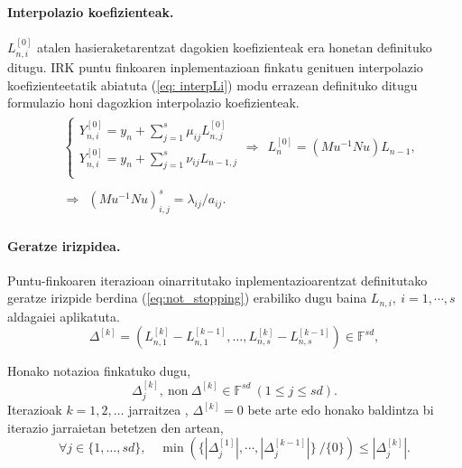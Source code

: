 \paragraph*{Interpolazio koefizienteak.} $L_{n,i}^{[0]}$ atalen hasieraketarentzat dagokien koefizienteak era honetan definituko ditugu. IRK puntu finkoaren inplementazioan finkatu genituen interpolazio koefizienteetatik abiatuta (\ref{eq: interpLi}) modu errazean definituko ditugu formulazio honi dagozkion interpolazio koefizienteak.
\begin{align}
\begin{split}
&\left \{ \begin{array}{c}
  Y_{n,i}^{[0]}=y_n+\sum_{j=1}^{s} \mu_{ij} L_{n,j}^{[0]} \\[.25cm]
  Y_{n,i}^{[0]}=y_n+\sum_{j=1}^{s} \nu_{ij} L_{n-1,j} \\
          \end{array} \right. 
\Rightarrow \ \ L_n^{{[0]}}=(Mu^{-1} Nu) L_{n-1},\\
\\
&\Rightarrow  \ \ (Mu^{-1} Nu)_{i,j}^{s}=\lambda_{ij}/a_{ij}.
\end{split}
\end{align}

\paragraph*{Geratze irizpidea.} Puntu-finkoaren iterazioan oinarritutako inplementazioarentzat definitutako geratze irizpide berdina (\ref{eq:not_stopping}) erabiliko dugu baina $L_{n,i}, \ i=1,\cdots,s$ aldagaiei aplikatuta.
\begin{equation*}
\Delta^{[k]}=(L_{n,1}^{[k]}-L_{n,1}^{[k-1]},\dots,L_{n,s}^{[k]}-L_{n,s}^{[k-1]}) \in \mathbb{F}^{sd},
\end{equation*}

Honako notazioa finkatuko dugu,
\begin{equation*}
\Delta_j^{[k]}, \ \text{non} \ \Delta^{[k]} \in \mathbb{F}^{sd}  \ (1\leqslant j \leqslant sd).
\end{equation*}
 Iterazioak  $k=1,2,\ldots$ jarraitzea , $ \Delta^{[k]} =0$ bete arte edo honako baldintza bi iterazio jarraietan betetzen den artean,
\begin{equation}
\label{eq:not_stoppingLi}
\forall j \in \{1,\ldots,s d\},  \quad
\min \left(\{|\Delta_j^{[1]}|,\cdots ,|\Delta_j^{[k-1]}|\} \ /\{0\} \right) \leqslant |\Delta_j^{[k]}|.
\end{equation}


